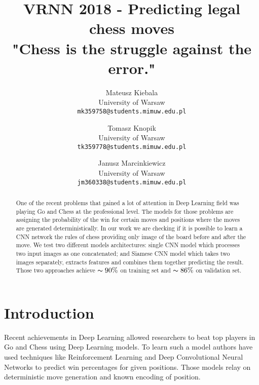 \documentclass[10pt,twocolumn,letterpaper]{article}
\begin{document}
\title{VRNN 2018 - Predicting legal chess moves \\ \large {\small "Chess is the struggle against the error."} }


\author{Mateusz Kiebala\\
University of Warsaw\\
{\tt\small mk359758@students.mimuw.edu.pl}
\and
Tomasz Knopik\\
University of Warsaw\\
{\tt\small tk359778@students.mimuw.edu.pl}
\and
Janusz Marcinkiewicz\\
University of Warsaw\\
{\tt\small jm360338@students.mimuw.edu.pl}}

\maketitle

\begin{abstract}
   One of the recent problems that gained a lot of attention in Deep Learning
   field was playing Go and Chess at the professional level. The models for
   those problems are assigning the probability of the win for certain moves and
   positions where the moves are generated deterministically. In our work we are
   checking if it is possible to learn a CNN network the rules of chess
   providing only image of the board before and after the move. We test two
   different models architectures: single CNN model which processes two input
   images as one concatenated; and Siamese CNN model which takes two images
   separately, extracts features and combines them together predicting the
   result. Those two approaches achieve $\thicksim 90\%$ on training set and
   $\thicksim 86\%$ on validation set.
\end{abstract}

\section{Introduction}

Recent achievements in Deep Learning allowed researchers to beat top players in
Go and Chess using Deep Learning models\cite{silver2017mastering}. To learn such
a model authors have used techniques like Reinforcement Learning and Deep
Convolutional Neural Networks to predict win percentages for given positions.
Those models relay on deterministic move generation and known encoding of
position.
\end{document}
